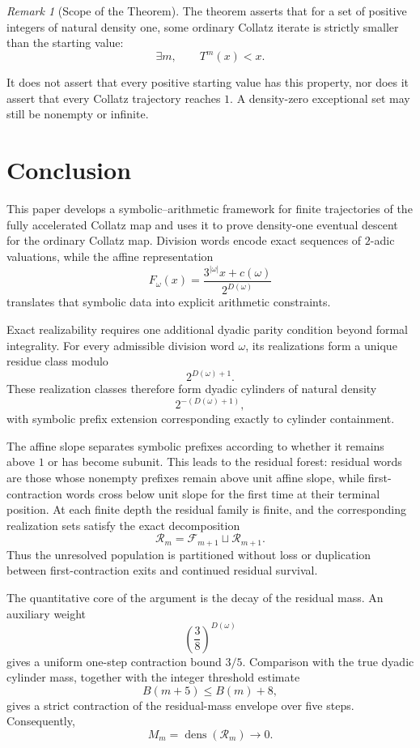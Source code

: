 \documentclass[12pt, oneside]{article}
\numberwithin{equation}{section}
\theoremstyle{definition}
\theoremstyle{plain}
\theoremstyle{remark}
\newtheorem*{remark}{Remark}
\begin{document}
\begin{remark}[Scope of the Theorem]
The theorem asserts that for a set of positive integers of natural density
one, some ordinary Collatz iterate is strictly smaller than the starting
value:
\[
\exists m,\qquad T^m(x)<x.
\]

It does not assert that every positive starting value has this property,
nor does it assert that every Collatz trajectory reaches \(1\). A
density-zero exceptional set may still be nonempty or infinite.
\end{remark}


\section{Conclusion}

This paper develops a symbolic--arithmetic framework for finite trajectories
of the fully accelerated Collatz map and uses it to prove density-one
eventual descent for the ordinary Collatz map. Division words encode exact
sequences of \(2\)-adic valuations, while the affine representation
\[
F_\omega(x)
=
\frac{3^{|\omega|}x+c(\omega)}{2^{D(\omega)}}
\]
translates that symbolic data into explicit arithmetic constraints.

Exact realizability requires one additional dyadic parity condition beyond
formal integrality. For every admissible division word \(\omega\), its
realizations form a unique residue class modulo
\[
2^{D(\omega)+1}.
\]
These realization classes therefore form dyadic cylinders of natural density
\[
2^{-(D(\omega)+1)},
\]
with symbolic prefix extension corresponding exactly to cylinder
containment.

The affine slope separates symbolic prefixes according to whether it remains
above \(1\) or has become subunit. This leads to the residual forest:
residual words are those whose nonempty prefixes remain above unit affine
slope, while first-contraction words cross below unit slope for the first
time at their terminal position. At each finite depth the residual family is
finite, and the corresponding realization sets satisfy the exact
decomposition
\[
\mathcal R_m
=
\mathcal F_{m+1}
\sqcup
\mathcal R_{m+1}.
\]
Thus the unresolved population is partitioned without loss or duplication
between first-contraction exits and continued residual survival.

The quantitative core of the argument is the decay of the residual mass.
An auxiliary weight
\[
\left(\frac38\right)^{D(\omega)}
\]
gives a uniform one-step contraction bound \(3/5\). Comparison with the
true dyadic cylinder mass, together with the integer threshold estimate
\[
B(m+5)\le B(m)+8,
\]
gives a strict contraction of the residual-mass envelope over five steps.
Consequently,
\[
M_m=\operatorname{dens}(\mathcal R_m)\longrightarrow0.
\]
\end{document}
